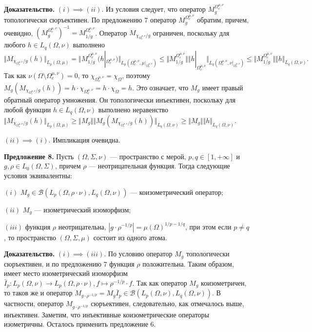 \documentclass[11pt,twoside]{article}
\begin{document}
        \textbf{Доказательство.} $(i)$$\implies$$ (ii)$. Из условия следует, что
        оператор $M_g^{\Omega_c^{\mu,\nu}}$ топологически сюръективен. По
        предложению 7 оператор $M_g^{\Omega_c^{\mu,\nu}}$ обратим, причем,
        очевидно,
    ${(M_g^{\Omega_c^{\mu,\nu}})}^{-1}=M_{1/g}^{\Omega_c^{\mu,\nu}}$.
        Оператор $M_{\chi_{\Omega_c^{\mu,\nu}}/g}$ ограничен, поскольку для
        любого $h\in L_q(\Omega,\nu)$ выполнено
$$
    \Vert
    M_{\chi_{\Omega_c^{\mu,\nu}}/g}(h)
    \Vert_{L_p(\Omega,\mu)}
    =\Vert
    M_{1/g}^{\Omega_c^{\mu,\nu}}(h|_{\Omega_c^{\mu,\nu}})
    \Vert_{L_p(\Omega_c^{\mu,\nu},\mu|_{\Omega_c^{\mu,\nu}})}
    \leq\Vert
    M_{1/g}^{\Omega_c^{\mu,\nu}}
    \Vert
    \Vert
    h|_{\Omega_c^{\mu,\nu}}
    \Vert_{L_q(\Omega_c^{\mu,\nu},\nu|_{\Omega_c^{\mu,\nu}})}
    \leq\Vert
    M_{1/g}^{\Omega_c^{\mu,\nu}}
    \Vert
    \Vert
    h
    \Vert_{L_q(\Omega,\nu)}.
$$
Так как $\nu(\Omega\setminus\Omega_c^{\mu,\nu})=0$, то
$\chi_{\Omega_c^{\mu,\nu}}=\chi_{\Omega}$, поэтому
$M_g(M_{\chi_{\Omega_c^{\mu,\nu}}/g}(h))
    =h\cdot\chi_{\Omega_c^{\mu,\nu}}=h\cdot\chi_{\Omega}=h$. Это означает, что $M_g$
имеет правый обратный оператор умножения. Он топологически инъективен, поскольку
для любой функции $h\in L_q(\Omega,\nu)$ выполнено неравенство $\Vert
    M_{\chi_{\Omega_c^{\mu,\nu}}/g}(h)\Vert_{L_p(\Omega,\mu)} \geq\Vert
    M_g\Vert\Vert M_g(M_{\chi_{\Omega_c^{\mu,\nu}}/g}(h))\Vert_{L_q(\Omega,\nu)}
    \geq\Vert M_g\Vert\Vert h\Vert_{L_q(\Omega,\nu)}$.

$(ii)$$\implies$$ (i)$. Импликация очевидна.

        \textbf{Предложение 8.} Пусть $(\Omega,\Sigma,\nu)$ --- пространство с
        мерой, $p,q\in[1,+\infty]$ и $g,\rho\in L_0(\Omega,\Sigma)$, причем $\rho$
        --- неотрицательная функция. Тогда следующие условия эквивалентны:

    $(i)$ $M_g\in\mathcal{B}(L_p(\Omega,\rho\cdot\nu),L_q(\Omega,\nu))$ ---
        коизометрический оператор;

    $(ii)$ $M_g$ --- изометрический изоморфизм;

    $(iii)$ функция $\rho$ неотрицательна, $|g\cdot
    \rho^{-1/p}|={\mu(\Omega)}^{1/p-1/q}$, при этом если $p\neq q$, то
        пространство $(\Omega,\Sigma,\mu)$ состоит из одного атома.

        \textbf{Доказательство.} $(i)$$\implies$$ (iii)$. По условию оператор
    $M_g$ топологически сюръективен, и по предложению 7 функция $\rho$
        положительна. Таким образом, имеет место изометрический изоморфизм
    $\bar{I}_p:L_p(\Omega,\nu)\to L_p(\Omega,\rho\cdot\nu),f\mapsto
    \rho^{-1/p}\cdot f$. Так как оператор $M_g$ коизометричен, то таков же и
        оператор $M_{g\cdot
            \rho^{-1/p}}=M_g\bar{I}_p\in\mathcal{B}(L_p(\Omega,\nu),L_q(\Omega,\nu))$.
        В частности, оператор $M_{g\cdot \rho^{-1/p}}$ сюръективен,
        следовательно, как отмечалось выше, инъективен. Заметим, что инъективные
        коизометрические операторы изометричны. Осталось применить предложение
        6.
\end{document}
